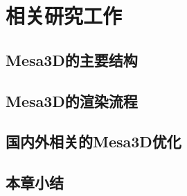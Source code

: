 

\chapter{相关研究工作}
\label{cha:Related-Research}

\section{Mesa3D的主要结构}


\section{Mesa3D的渲染流程}


\section{国内外相关的Mesa3D优化}

\section{本章小结}
